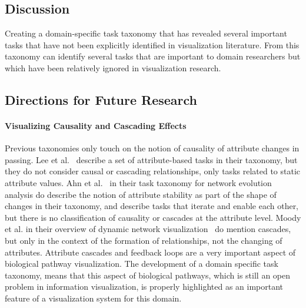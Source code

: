 \documentclass[twocolumn]{bmcart}%
\begin{document}



\subsection*{Discussion}

Creating a domain-specific task taxonomy that has revealed several important tasks that have not been explicitly identified in visualization literature.
From this taxonomy can identify several tasks that are important to domain researchers but which have been relatively ignored in visualization research.

\subsection*{Directions for Future Research}

\paragraph{Visualizing Causality and Cascading Effects}

Previous taxonomies only touch on the notion of causality of attribute changes in passing.
Lee et al.~\cite{Lee2006} describe a set of attribute-based tasks in their taxonomy, but they do not consider causal or cascading relationships, only tasks related to static attribute values.
Ahn et al.~\cite{Ahn2014} in their task taxonomy for network evolution analysis do describe the notion of attribute stability as part of the shape of changes in their taxonomy, and describe tasks that iterate and enable each other, but there is no classification of causality or cascades at the attribute level.
Moody et al. in their overview of dynamic network visualization~\cite{moody2005dynamic} do mention cascades, but only in the context of the formation of relationships, not the changing of attributes.
Attribute cascades and feedback loops are a very important aspect of biological pathway visualization.
The development of a domain specific task taxonomy, means that this aspect of biological pathways, which is still an open problem in information visualization, is properly highlighted as an important feature of a visualization system for this domain.
\end{document}
